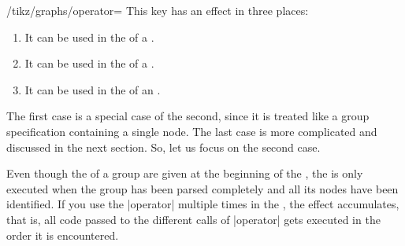 \begin{key}{/tikz/graphs/operator=}
  This key has an effect in three places:
  \begin{enumerate}
  \item It can be used in the  of a .
  \item It can be used in the  of a .
  \item It can be used in the  of an .
  \end{enumerate}
  The first case is a special case of the second, since it is treated
  like a group specification containing a single node. The last case
  is more complicated and discussed in the next section.
  So, let us focus on the second case.

  Even though the  of a group are given at the beginning
  of the , the  is only executed
  when the group has been parsed completely and all its nodes have
  been identified. If you use the |operator| multiple times in the
  , the effect accumulates, that is, all code passed to
  the different calls of |operator| gets executed in the order it is
  encountered. 


\end{key}

